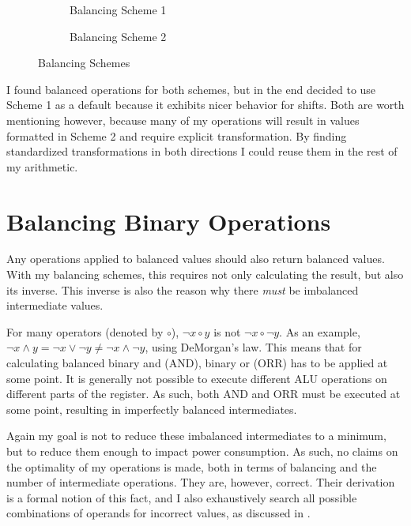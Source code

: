 \begin{figure}[h]
  \centering
  \begin{subfigure}{.49\linewidth}
    \centering
    \caption{Balancing Scheme 1}
    \label{fig:scheme1}
  \end{subfigure}
  \begin{subfigure}{0.49\linewidth}
    \centering
    \caption{Balancing Scheme 2}
  \end{subfigure}
  \caption{Balancing Schemes}
  \label{fig:schemes}
\end{figure}

I found balanced operations for both schemes, but in the end decided to use Scheme 1 as a default because it exhibits nicer behavior for shifts.
Both are worth mentioning however, because many of my operations will result in values formatted in Scheme 2 and require explicit transformation.
By finding standardized transformations in both directions I could reuse them in the rest of my arithmetic.

\section{Balancing Binary Operations}
\label{operations}
Any operations applied to balanced values should also return balanced values.
With my balancing schemes, this requires not only calculating the result, but also its inverse.
This inverse is also the reason why there \emph{must} be imbalanced intermediate values.

For many operators (denoted by $\circ$), $\neg{x \circ y}$ is not $\neg{x} \circ \neg{y}$.
As an example, $\neg{x \land y} = \neg{x} \lor \neg{y} \neq \neg{x} \land \neg{y}$, using DeMorgan's law.
This means that for calculating balanced binary and (AND), binary or (ORR) has to be applied at some point.
It is generally not possible to execute different ALU operations on different parts of the register.
As such, both AND and ORR must be executed at some point, resulting in imperfectly balanced intermediates.

Again my goal is not to reduce these imbalanced intermediates to a minimum, but to reduce them enough to impact power consumption.
As such, no claims on the optimality of my operations is made, both in terms of balancing and the number of intermediate operations.
They are, however, correct.
Their derivation is a formal notion of this fact, and I also exhaustively search all possible combinations of operands for incorrect values, as discussed in .

